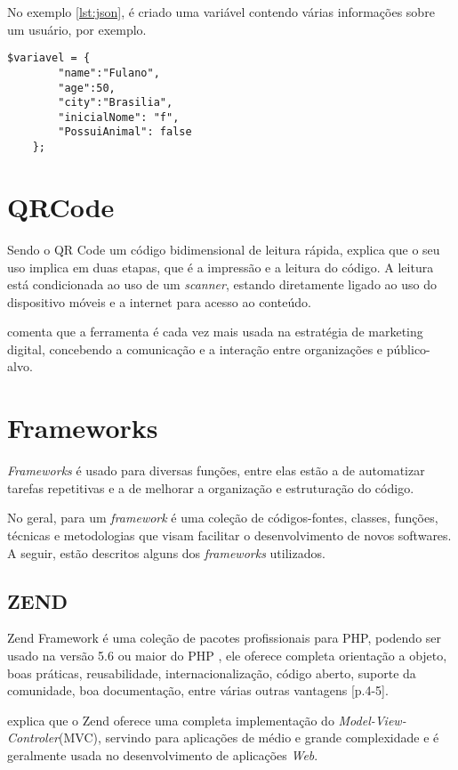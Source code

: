 No exemplo \ref{lst:json}, é criado uma variável contendo várias informações sobre um usuário, por exemplo. 

\begin{lstlisting}[caption={Exemplo de JSON},label={lst:json}]
	$variavel = { 
		"name":"Fulano", 
		"age":50, 
		"city":"Brasilia",
		"inicialNome": "f",
		"PossuiAnimal": false
	};
\end{lstlisting}

\section{QRCode}
Sendo o QR Code um código bidimensional de leitura rápida, \cite{sousa2014} explica que o seu uso implica em duas etapas, que é a impressão e a leitura do código. A leitura está condicionada ao uso de um \textit{scanner}, estando diretamente ligado ao uso do dispositivo móveis e a internet para acesso ao conteúdo.

\cite{sousa2014} comenta que a ferramenta é cada vez mais usada na estratégia de marketing digital, concebendo a comunicação e a interação entre organizações e público-alvo.

\section{Frameworks}
\textit{Frameworks} é usado para diversas funções, entre elas estão a de automatizar tarefas repetitivas e a de melhorar a organização e estruturação do código.  

No geral, para \cite{minetto2007} um \textit{framework} é uma coleção de códigos-fontes, classes, funções, técnicas e metodologias que visam facilitar o desenvolvimento de novos softwares. A seguir, estão descritos alguns dos \textit{frameworks} utilizados.

\subsection{ZEND}
Zend Framework é uma coleção de pacotes profissionais para PHP, podendo ser usado na versão 5.6 ou maior do PHP \cite{zend2018}, ele oferece completa orientação a objeto, boas práticas, reusabilidade, internacionalização, código aberto, suporte da comunidade, boa documentação, entre várias outras vantagens \cite{vaswani2010}[p.4-5].

\cite[p.3]{vaswani2010} explica que o Zend oferece uma completa implementação do \textit{Model-View-Controler}(MVC), servindo para aplicações de médio e grande complexidade e é geralmente usada no desenvolvimento de aplicações \textit{Web}.

